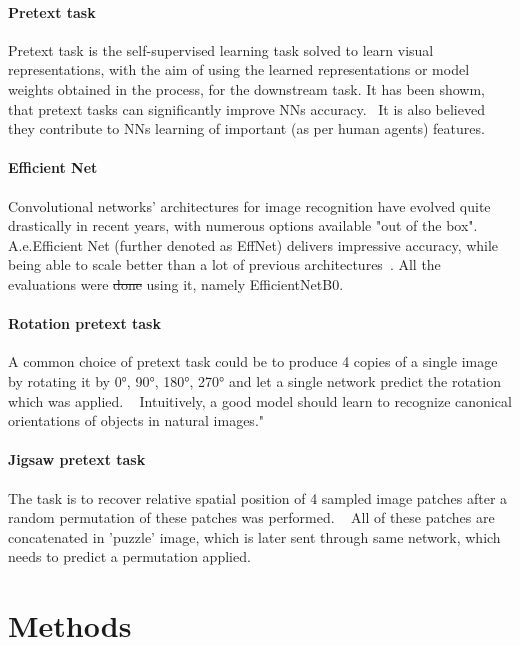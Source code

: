 \paragraph{Pretext task}
Pretext task is the self-supervised learning task solved to learn visual representations,
with the aim of using the learned representations or model weights obtained in the process, for the downstream task.
It has been showm, that pretext tasks can significantly improve NNs accuracy.~\cite{kolesnikov2019revisiting}
It is also believed they contribute to NNs learning of important (as per human agents) features.

\paragraph{Efficient Net}
Convolutional networks' architectures for image recognition have evolved quite drastically in recent years, with numerous options available "out of the box".
A.e.Efficient Net (further denoted as EffNet) delivers impressive accuracy, while being able to scale better than a lot of previous architectures~\cite{DBLP:journals/corr/abs-1905-11946}.
All the evaluations were \st{done} using it, namely EfficientNetB0.

\paragraph{Rotation pretext task}
A common choice of pretext task could be to produce 4 copies of
a single image by rotating it by {0°, 90°, 180°, 270°} and let a single network predict the rotation which was applied.
~\cite{kolesnikov2019revisiting}
Intuitively, a good model should learn to recognize canonical orientations of objects in natural images."

\paragraph{Jigsaw pretext task}
The task is to recover relative spatial position of 4 sampled image patches after a random permutation of these patches was performed.
~\cite{kolesnikov2019revisiting}
All of these patches are concatenated in 'puzzle' image, which is later sent through same network, which needs to predict a permutation applied.


\section{Methods}


